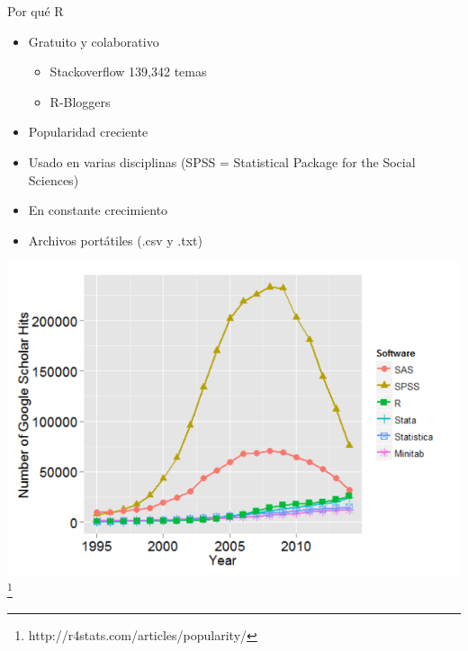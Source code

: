 \documentclass{beamer}
\begin{document}
    \begin{frame}{Por qu\'e R}
     \begin{itemize}
     \item Gratuito	y colaborativo
          \begin{itemize}
               \item Stackoverflow 139,342 temas 
			   \item R-Bloggers
          \end{itemize}
      \item Popularidad creciente
      \item Usado en varias disciplinas (SPSS = Statistical Package for the Social Sciences)
	  \item En constante crecimiento
	  \item Archivos port\'atiles (.csv y .txt)
      \end{itemize}
  \end{frame}
  
\begin{frame}
      \includegraphics[scale=0.5]{use}\footnote{http://r4stats.com/articles/popularity/}
\end{frame}
\end{document}
